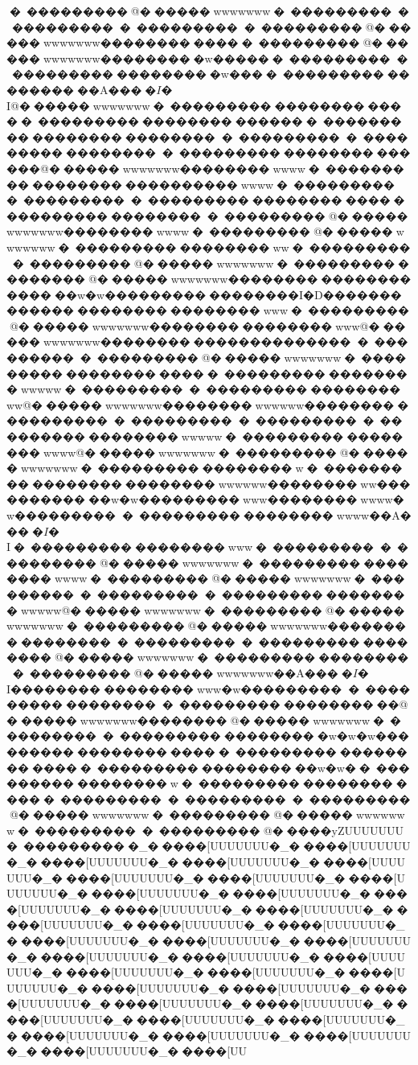 {{{{{{{{{{{{{{{{{{{{{{{{{{{{{{{{{{{{{{{{{{{{{{{{{{{{{{{{{{{{{{{{{{{{{{{{{{{{{�~���������   @������wwwwwww�~���������   �~���������   �~���������   �~���������   @������wwwwwww��������� � � ��~���������   @������wwwwwww���������w������~���������   �~���������   ���������w� � ��~���������   ��������       ��A���   �$I�$I@������wwwwwww�~���������   ��������� � � ��~���������   ��������� ������~���������   ��������       ��������       �~���������   �~���������   ��������       �~���������   ��������� �����@������wwwwwww��������w w w w�~���������   ��������   � � ��������   wwww�~���������   �~���������   �~���������   ��������� � � ��~���������   ��������       �~���������   @������wwwwwww��������w w w w�~���������   @������wwwwwww�~���������   ��������w w    �~���������   �~���������   @������wwwwwww�~���������   ��������       @������wwwwwww��������� � � ���������� �w�w���������       ��������I�D�������������       ��������       �������� w w w �~���������   @������wwwwwww��������       ��������www    @������wwwwwww��������� �������������       �~���������   �~���������   @������wwwwwww�~���������   ��������   �����~���������   ��������wwww w �~���������   �~���������   ��������w w    @������wwwwwww��������w wwwww��������� �    ��������       �~���������   �~���������   �~���������   ��������www w w�~���������   ��������w w w w@������wwwwwww�~���������   @������wwwwwww�~���������   �������� w     �~���������   ��������       ��������w wwwww��������w w � ���������� �w�w��������� w w w ��������wwww�w���������       �~���������   ��������   wwww��A���   �$I�$I�~���������   �������� w w w �~���������   �~���������   @������wwwwwww�~���������   ��������w w w w�~���������   @������wwwwwww�~���������   �~���������   �~���������   �������� w wwww@������wwwwwww�~���������   @������wwwwwww�~���������   @������wwwwwww��������       ��������       �~���������   �~���������   ��������       @������wwwwwww�~���������   ��������       �~���������   @������wwwwwww��A���   �$I�$I��������       ��������w ww�w���������       �~���������   ��������       �~���������   ��������    � �@������wwwwwww��������       @������wwwwwww�~���������   �~���������   ���������w�w�w���������       ��������� �� � �~���������   ��������� �� � �~���������   ��������� �w�w��~���������   �������� w     �~���������   ��������� � � ��~���������   �~���������   �~���������   @������wwwwwww�~���������   @������wwwwwww�~���������   �~���������   @�����yZUUUUUUU�~���������   �_�����[UUUUUUU�_�����[UUUUUUU�_�����[UUUUUUU�_�����[UUUUUUU�_�����[UUUUUUU�_�����[UUUUUUU�_�����[UUUUUUU�_�����[UUUUUUU�_�����[UUUUUUU�_�����[UUUUUUU�_�����[UUUUUUU�_�����[UUUUUUU�_�����[UUUUUUU�_�����[UUUUUUU�_�����[UUUUUUU�_�����[UUUUUUU�_�����[UUUUUUU�_�����[UUUUUUU�_�����[UUUUUUU�_�����[UUUUUUU�_�����[UUUUUUU�_�����[UUUUUUU�_�����[UUUUUUU�_�����[UUUUUUU�_�����[UUUUUUU�_�����[UUUUUUU�_�����[UUUUUUU�_�����[UUUUUUU�_�����[UUUUUUU�_�����[UUUUUUU�_�����[UUUUUUU�_�����[UUUUUUU�_�����[UUUUUUU�_�����[UUUUUUU�_�����[UUUUUUU�_�����[UUUUUUU�_�����[UUUUUUU�_�����[UU}}}}}}}}}}}}}}}}}}}}}}}}}}}}}}}}}}}}}}}}}}}}}}}}}}}}}}}}}}}}}}}}}}}}}}}}}}}}}
